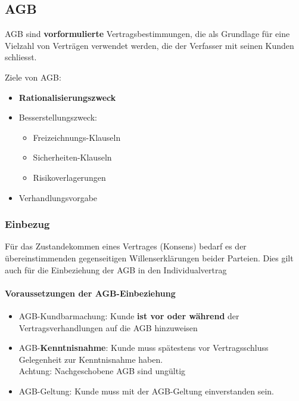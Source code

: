\subsection{AGB}

AGB sind \textbf{vorformulierte} Vertragsbestimmungen, die als Grundlage
für eine Vielzahl von Verträgen verwendet werden, die der Verfasser mit
seinen Kunden schliesst.

Ziele von AGB:
\begin{itemize}
	\tightlist
	\item \textbf{Rationalisierungszweck}
	\item Besserstellungszweck:
	\begin{itemize}
		\tightlist
		\item Freizeichnungs-Klauseln
		\item  Sicherheiten-Klauseln
		\item Risikoverlagerungen
	\end{itemize}
	\item Verhandlungsvorgabe
\end{itemize}


\subsubsection{Einbezug}
Für das Zustandekommen eines Vertrages (Konsens) bedarf es der
übereinstimmenden gegenseitigen Willenserklärungen beider Parteien. Dies
gilt auch für die Einbeziehung der AGB in den Individualvertrag

\paragraph{Voraussetzungen der AGB-Einbeziehung}
\begin{itemize}
	\item AGB-Kundbarmachung:
	Kunde \textbf{ist vor oder während} der Vertragsverhandlungen auf die
	AGB hinzuweisen
	\item AGB-\textbf{Kenntnisnahme}: Kunde muss spätestens vor
	Vertragsschluss Gelegenheit zur Kenntnisnahme haben.\\
	Achtung: Nachgeschobene AGB sind ungültig
	\item AGB-Geltung: Kunde muss mit der AGB-Geltung einverstanden sein.
\end{itemize}


